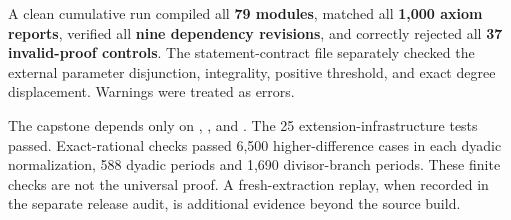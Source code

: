 A clean cumulative run compiled all \textbf{79 modules}, matched all \textbf{1,000 axiom reports}, verified all \textbf{nine dependency revisions}, and correctly rejected all \textbf{37 invalid-proof controls}. The statement-contract file separately checked the external parameter disjunction, integrality, positive threshold, and exact degree displacement. Warnings were treated as errors.

The capstone depends only on , , and . The 25 extension-infrastructure tests passed. Exact-rational checks passed 6,500 higher-difference cases in each dyadic normalization, 588 dyadic periods and 1,690 divisor-branch periods. These finite checks are not the universal proof. A fresh-extraction replay, when recorded in the separate release audit, is additional evidence beyond the source build.
